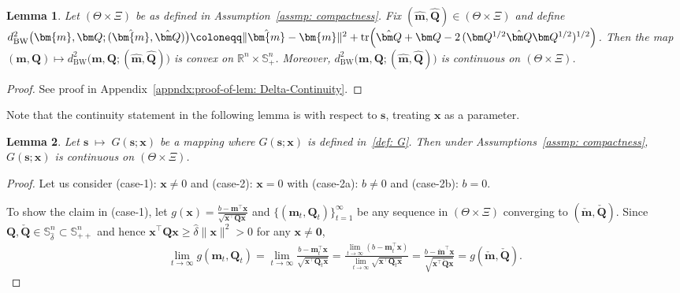 \documentclass[opre,sglanonrev]{informs4}
\newtheorem{lemma}{Lemma}
\newcommand{\mN}{\mathcal{N}}
\newcommand{\mbR}{\mathbb R}
\newcommand{\mbS}{\mathbb S}
\newcommand{\bzero}{\bm{0}}
\newcommand{\bmean}{\bm{m}}
\newcommand{\bs}{\bm{s}}
\newcommand{\bx}{\bm{x}}
\newcommand{\bQ}{\bm Q}
\newcommand{\Tr}{\operatorname{tr}}
\begin{document}
{%

\begin{lemma}\label{lem: Delta-Continuity}
Let $(\Theta \times \Xi)$ be as defined in Assumption~\ref{assmp: compactness}. Fix $(\hat{\bmean}, \hat{\bQ}) \in (\Theta \times \Xi)$ and define $d^2_{\mathrm{BW}}\bigl(\bmean, \bQ; (\hat{\bmean}, \hat{\bQ})\bigr) \coloneqq \|\hat{\bmean} - \bmean\|^2 + \Tr\Bigl(\hat{\bQ}+\bQ -2\,(\bQ^{1/2}\hat{\bQ}\bQ^{1/2})^{1/2}\Bigr)$.
Then the map $(\bmean, \bQ) \mapsto d^2_{\mathrm{BW}}\big(\bmean,\bQ;(\hat{\bmean},\hat{\bQ})\big)$ is convex on $\mbR^n\times \mbS_+^n$. Moreover, $d^2_{\mathrm{BW}}\big(\bmean,\bQ;(\hat{\bmean},\hat{\bQ})\big)$ is continuous on $(\Theta \times \Xi)$.
\end{lemma}
\begin{proof}
    See proof in Appendix~\ref{appndx:proof-of-lem: Delta-Continuity}.
\end{proof}

Note that the continuity statement in the following lemma is with respect to $\bs$, treating $\bx$ as a parameter.
\begin{lemma}\label{lem: G-continuity-mu-sigma}
Let $\bs\;\mapsto\;G(\bs; \bx)$
be a mapping where $G(\bs; \bx)$ is defined in~\eqref{def: G}. Then under Assumptions~\ref{assmp: compactness}, $G(\bs; \bx)$ is continuous on $(\Theta \times \Xi)$.
\end{lemma}


\begin{proof}
 Let us consider (case-1): $\bx \neq 0$ and (case-2): $\bx = 0$ with (case-2a): $b \neq 0$ and (case-2b): $b=0$.

To show the claim in (case-1), let $g(\bx) = \frac{b-\bmean^\top \bx}{\sqrt{\bx^\top \bQ \bx}}$ and $\{(\bmean_t, \bQ_t)\}^\infty_{t=1}$ be any sequence in $(\Theta \times \Xi)$ converging to $(\check{\bmean}, \check{\bQ})$. Since $\bQ, \check{\bQ} \in \mbS^n_{\hat{\delta}} \subset \mbS^n_{++}$ and hence $\bx^\top \bQ \bx \geq \hat{\delta} \|\bx\|^2 > 0$ for any $\bx \neq \bzero$,
\begin{align*}
    \lim_{t \to \infty} g(\bmean_t, \bQ_t) = \lim_{t \to \infty} \frac{b-\bmean_t^\top \bx}{\sqrt{\bx^\top \bQ_t \bx}} = \frac{\lim_{t \to \infty} (b-\bmean^\top_t \bx)}{\lim_{t \to \infty} \sqrt{\bx^\top \bQ_t \bx}} = \frac{b-\check{\bmean}^\top \bx}{\sqrt{\bx^\top \check{\bQ} \bx}} = g(\check{\bmean}, \check{\bQ}).
\end{align*}


\end{proof}}
\end{document}
